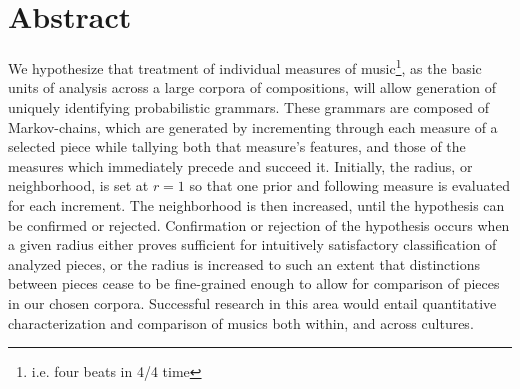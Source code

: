  \doublespace

 \section{Abstract} We hypothesize that treatment of individual measures of music\footnote{i.e. four beats in 4/4 time}, as the basic units of analysis across a large corpora of compositions, will allow generation of uniquely identifying probabilistic grammars. These grammars are composed of Markov-chains, which are generated by incrementing through each measure of a selected piece while tallying both that measure’s features, and those of the measures which immediately precede and succeed it. Initially, the radius, or neighborhood, is set at $r = 1$ so that one prior and following measure is evaluated for each increment. The neighborhood is then increased, until the hypothesis can be confirmed or rejected. Confirmation or rejection of the hypothesis occurs when a given radius either proves sufficient for intuitively satisfactory classification of analyzed pieces, or the radius is increased to such an extent that distinctions between pieces cease to be fine-grained enough to allow for comparison of pieces in our chosen corpora. Successful research in this area would entail quantitative characterization and comparison of musics both within, and across cultures.


